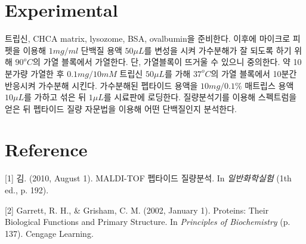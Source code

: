\documentclass[%
 reprint,
 amsmath,amssymb,
 aps,
]{revtex4-2}
\begin{document}
\section{\label{sec:level1}Experimental}
트립신, CHCA matrix, lysozome, BSA, ovalbumin을 준비한다. 이후에 마이크로 피펫을 이용해 $1mg/ml$ 단백질 용액 $50\mu L$를 변성을 시켜 가수분해가 잘 되도록 하기 위해 $90^{o}C$의 가열 블록에서 가열한다. 단, 가열블록이 뜨거울 수 있으니 중의한다. 약 10분가량 가열한 후 $0.1mg/10mM$ 트립신 $50\mu L$를 가해 $37^{o}C$의 가열 블록에서 10분간 반응시켜 가수분해 시킨다. 가수분해된 펩타이드 용액을 $10mg/0.1\%$ 매트립스 용액 $10\mu L$를 가하고 섞은 뒤 $1\mu L$를 시료판에 로딩한다. 질량분석기를 이용해 스펙트럼을 얻은 뒤 펩타이드 질량 자문법을 이용해 어떤 단백질인지 분석한다.

\section{\label{sec:level1}Reference}
[1] 김. (2010, August 1). MALDI-TOF 펩타이드 질량분석. In \textit{일반화학실험} (1th ed., p. 192).

[2] Garrett, R. H., \& Grisham, C. M. (2002, January 1). Proteins: Their Biological Functions and Primary Structure. In \textit{Principles of Biochemistry} (p. 137). Cengage Learning.
\end{document}
